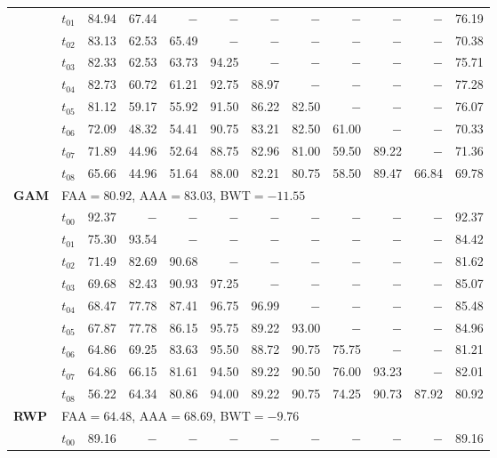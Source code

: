 \begin{table}[ht]
\begin{tabular}{@{}l l r r r r r r r r r r@{}}
 & $t_{01}$ & 84.94 & 67.44 & $-$ & $-$ & $-$ & $-$ & $-$ & $-$ & $-$ & 76.19 \\
 & $t_{02}$ & 83.13 & 62.53 & 65.49 & $-$ & $-$ & $-$ & $-$ & $-$ & $-$ & 70.38 \\
 & $t_{03}$ & 82.33 & 62.53 & 63.73 & 94.25 & $-$ & $-$ & $-$ & $-$ & $-$ & 75.71 \\
 & $t_{04}$ & 82.73 & 60.72 & 61.21 & 92.75 & 88.97 & $-$ & $-$ & $-$ & $-$ & 77.28 \\
 & $t_{05}$ & 81.12 & 59.17 & 55.92 & 91.50 & 86.22 & 82.50 & $-$ & $-$ & $-$ & 76.07 \\
 & $t_{06}$ & 72.09 & 48.32 & 54.41 & 90.75 & 83.21 & 82.50 & 61.00 & $-$ & $-$ & 70.33 \\
 & $t_{07}$ & 71.89 & 44.96 & 52.64 & 88.75 & 82.96 & 81.00 & 59.50 & 89.22 & $-$ & 71.36 \\
 & $t_{08}$ & 65.66 & 44.96 & 51.64 & 88.00 & 82.21 & 80.75 & 58.50 & 89.47 & 66.84 & 69.78 \\
\midrule
\multirow{10}{*}{\textbf{GAM}} & \multicolumn{11}{l}{\quad\small FAA$=80.92$,\; AAA$=83.03$,\; BWT$=-11.55$} \\
 & $t_{00}$ & 92.37 & $-$ & $-$ & $-$ & $-$ & $-$ & $-$ & $-$ & $-$ & 92.37 \\
 & $t_{01}$ & 75.30 & 93.54 & $-$ & $-$ & $-$ & $-$ & $-$ & $-$ & $-$ & 84.42 \\
 & $t_{02}$ & 71.49 & 82.69 & 90.68 & $-$ & $-$ & $-$ & $-$ & $-$ & $-$ & 81.62 \\
 & $t_{03}$ & 69.68 & 82.43 & 90.93 & 97.25 & $-$ & $-$ & $-$ & $-$ & $-$ & 85.07 \\
 & $t_{04}$ & 68.47 & 77.78 & 87.41 & 96.75 & 96.99 & $-$ & $-$ & $-$ & $-$ & 85.48 \\
 & $t_{05}$ & 67.87 & 77.78 & 86.15 & 95.75 & 89.22 & 93.00 & $-$ & $-$ & $-$ & 84.96 \\
 & $t_{06}$ & 64.86 & 69.25 & 83.63 & 95.50 & 88.72 & 90.75 & 75.75 & $-$ & $-$ & 81.21 \\
 & $t_{07}$ & 64.86 & 66.15 & 81.61 & 94.50 & 89.22 & 90.50 & 76.00 & 93.23 & $-$ & 82.01 \\
 & $t_{08}$ & 56.22 & 64.34 & 80.86 & 94.00 & 89.22 & 90.75 & 74.25 & 90.73 & 87.92 & 80.92 \\
\midrule
\multirow{10}{*}{\textbf{RWP}} & \multicolumn{11}{l}{\quad\small FAA$=64.48$,\; AAA$=68.69$,\; BWT$=-9.76$} \\
 & $t_{00}$ & 89.16 & $-$ & $-$ & $-$ & $-$ & $-$ & $-$ & $-$ & $-$ & 89.16 \\

\end{tabular}
\end{table}
